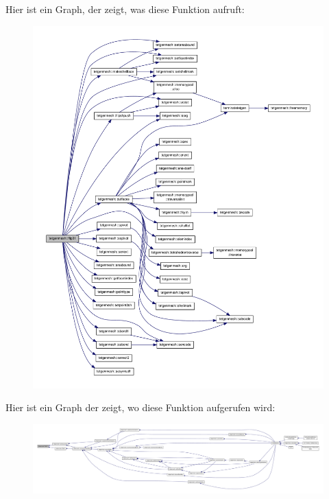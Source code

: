 Hier ist ein Graph, der zeigt, was diese Funktion aufruft\-:\nopagebreak
\begin{figure}[H]
\begin{center}
\leavevmode
\includegraphics[width=350pt]{classtetgenmesh_a3db30cb237ac5cbcda3ac70a1ea31666_cgraph}
\end{center}
\end{figure}




Hier ist ein Graph der zeigt, wo diese Funktion aufgerufen wird\-:\nopagebreak
\begin{figure}[H]
\begin{center}
\leavevmode
\includegraphics[width=350pt]{classtetgenmesh_a3db30cb237ac5cbcda3ac70a1ea31666_icgraph}
\end{center}
\end{figure}


